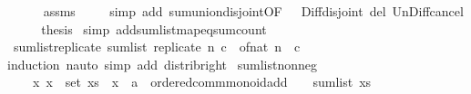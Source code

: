 \begin{isabellebody}
\ \ \ \ \isamarkupfalse%
\ assms{\isacharparenleft}{\kern0pt}{}{\isacharparenright}{\kern0pt}\isanewline
\ \ \ \ \isamarkupfalse%
{\isacharparenleft}{\kern0pt}simp\ add{\isacharcolon}{\kern0pt}\ sum{\isachardot}{\kern0pt}union{\isacharunderscore}{\kern0pt}disjoint{\isacharbrackleft}{\kern0pt}OF\ {\isacharunderscore}{\kern0pt}\ {\isacharunderscore}{\kern0pt}\ Diff{\isacharunderscore}{\kern0pt}disjoint{\isacharbrackright}{\kern0pt}\ del{\isacharcolon}{\kern0pt}\ Un{\isacharunderscore}{\kern0pt}Diff{\isacharunderscore}{\kern0pt}cancel{\isacharparenright}{\kern0pt}\isanewline
\ \ \isamarkupfalse%
\ \isamarkupfalse%
\ {\isacharquery}{\kern0pt}thesis\ \isamarkupfalse%
{\isacharparenleft}{\kern0pt}simp\ add{\isacharcolon}{\kern0pt}sum{\isacharunderscore}{\kern0pt}list{\isacharunderscore}{\kern0pt}map{\isacharunderscore}{\kern0pt}eq{\isacharunderscore}{\kern0pt}sum{\isacharunderscore}{\kern0pt}count{\isacharparenright}{\kern0pt}\isanewline
{}\isamarkupfalse%
%
\endisatagproof
{\isafoldproof}%
%
\isadelimproof
\isanewline
%
\endisadelimproof
\isanewline
{}\isamarkupfalse%
\ sum{\isacharunderscore}{\kern0pt}list{\isacharunderscore}{\kern0pt}replicate{\isacharcolon}{\kern0pt}\ {\isachardoublequoteopen}sum{\isacharunderscore}{\kern0pt}list\ {\isacharparenleft}{\kern0pt}replicate\ n\ c{\isacharparenright}{\kern0pt}\ {\isacharequal}{\kern0pt}\ of{\isacharunderscore}{\kern0pt}nat\ n\ {\isacharasterisk}{\kern0pt}\ c{\isachardoublequoteclose}\isanewline
%
\isadelimproof
%
\endisadelimproof
%
\isatagproof
{}\isamarkupfalse%
{\isacharparenleft}{\kern0pt}induction\ n{\isacharparenright}{\kern0pt}{\isacharparenleft}{\kern0pt}auto\ simp\ add{\isacharcolon}{\kern0pt}\ distrib{\isacharunderscore}{\kern0pt}right{\isacharparenright}{\kern0pt}%
\endisatagproof
{\isafoldproof}%
%
\isadelimproof
\isanewline
%
\endisadelimproof
\isanewline
\isanewline
{}\isamarkupfalse%
\ sum{\isacharunderscore}{\kern0pt}list{\isacharunderscore}{\kern0pt}nonneg{\isacharcolon}{\kern0pt}\isanewline
\ \ \ \ {\isachardoublequoteopen}{\isacharparenleft}{\kern0pt}{\isasymAnd}x{\isachardot}{\kern0pt}\ x\ {\isasymin}\ set\ xs\ {\isasymLongrightarrow}\ {\isacharparenleft}{\kern0pt}x\ {\isacharcolon}{\kern0pt}{\isacharcolon}{\kern0pt}\ {\isacharprime}{\kern0pt}a\ {\isacharcolon}{\kern0pt}{\isacharcolon}{\kern0pt}\ ordered{\isacharunderscore}{\kern0pt}comm{\isacharunderscore}{\kern0pt}monoid{\isacharunderscore}{\kern0pt}add{\isacharparenright}{\kern0pt}\ {\isasymge}\ {}{\isacharparenright}{\kern0pt}\ {\isasymLongrightarrow}\ sum{\isacharunderscore}{\kern0pt}list\ xs\ {\isasymge}\ {}{\isachardoublequoteclose}\isanewline

\end{isabellebody}
